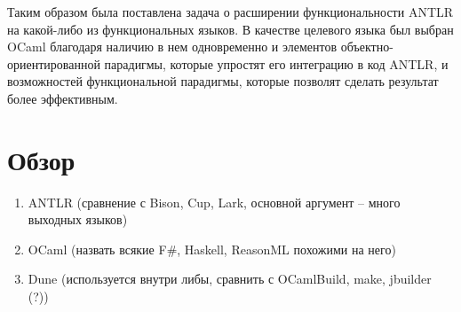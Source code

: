 \documentclass{article}
\begin{document}
Таким образом была поставлена задача о расширении функциональности ANTLR на какой-либо из функциональных языков. 
В качестве целевого языка был выбран OCaml благодаря наличию в нем одновременно и элементов объектно-ориентированной парадигмы, которые упростят его интеграцию в код ANTLR, 
и возможностей функциональной парадигмы, которые позволят сделать результат более эффективным.

\section{Обзор}
\begin{enumerate}
    \item ANTLR (сравнение с Bison, Cup, Lark, основной аргумент -- много выходных языков)
    \item OCaml (назвать всякие F#, Haskell, ReasonML похожими на него)
    \item Dune (используется внутри либы, сравнить с OCamlBuild, make, jbuilder (?))
\end{enumerate}
\end{document}
